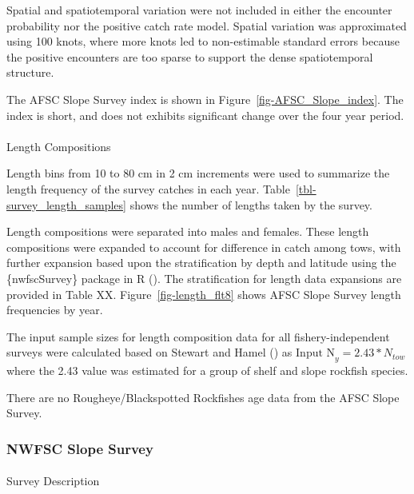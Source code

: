\documentclass[
]{scrartcl}
\makeatletter
\let\oldparagraph\paragraph
\renewcommand{\paragraph}{
    \@ifstar
      \xxxParagraphStar
      \xxxParagraphNoStar
  }
\newcommand{\xxxParagraphStar}[1]{\oldparagraph*{#1}\mbox{}}
\newcommand{\xxxParagraphNoStar}[1]{\oldparagraph{#1}\mbox{}}
\makeatother
\begin{document}
Spatial and spatiotemporal variation were not included in either the
encounter probability nor the positive catch rate model. Spatial
variation was approximated using 100 knots, where more knots led to
non-estimable standard errors because the positive encounters are too
sparse to support the dense spatiotemporal structure.

The AFSC Slope Survey index is shown in
Figure~\ref{fig-AFSC_Slope_index}. The index is short, and does not
exhibits significant change over the four year period.

\paragraph{Length Compositions}\label{length-compositions-1}

Length bins from 10 to 80 cm in 2 cm increments were used to summarize
the length frequency of the survey catches in each year.
Table~\ref{tbl-survey_length_samples} shows the number of lengths taken
by the survey.

Length compositions were separated into males and females. These length
compositions were expanded to account for difference in catch among
tows, with further expansion based upon the stratification by depth and
latitude using the \{nwfscSurvey\} package in R
(). The stratification for length data expansions are provided in
Table XX. Figure~\ref{fig-length_flt8} shows AFSC Slope Survey length
frequencies by year.

The input sample sizes for length composition data for all
fishery-independent surveys were calculated based on Stewart and Hamel
() as
\(\text{Input N}_{y} = 2.43*N_{tow}\) where the 2.43 value was estimated
for a group of shelf and slope rockfish species.

There are no Rougheye/Blackspotted Rockfishes age data from the AFSC
Slope Survey.

\subsubsection{NWFSC Slope Survey}\label{nwfsc-slope-survey}

\paragraph{Survey Description}\label{survey-description-3}
\end{document}
